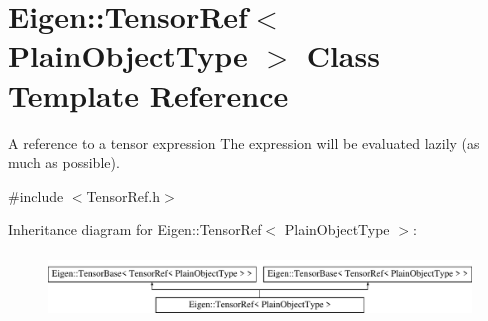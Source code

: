 \hypertarget{class_eigen_1_1_tensor_ref}{}\section{Eigen\+:\+:Tensor\+Ref$<$ Plain\+Object\+Type $>$ Class Template Reference}
\label{class_eigen_1_1_tensor_ref}


A reference to a tensor expression The expression will be evaluated lazily (as much as possible).  




{\ttfamily \#include $<$Tensor\+Ref.\+h$>$}

Inheritance diagram for Eigen\+:\+:Tensor\+Ref$<$ Plain\+Object\+Type $>$\+:\begin{figure}[H]
\begin{center}
\leavevmode
\includegraphics[height=1.728395cm]{class_eigen_1_1_tensor_ref}
\end{center}
\end{figure}
